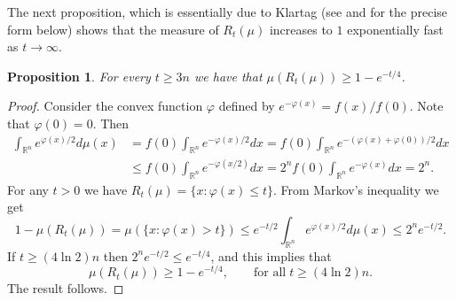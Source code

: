 \documentclass[11pt,leqno]{article}
\newtheorem{proposition}[theorem]{Proposition}
\theoremstyle{definition}
\theoremstyle{remark}
\numberwithin{equation}{section}
\newcommand{\ls}{\leqslant}
\newcommand{\gr}{\geqslant}
\newcommand{\1}{\textbf{1}}
\begin{document}

The next proposition, which is essentially due to Klartag (see \cite[Lemma~5.2]{Klartag-2007} and \cite{Giannopoulos-Tziotziou-2025}
for the precise form below) shows that the measure of $R_t(\mu)$ increases to $1$
exponentially fast as $t\to\infty $.

\begin{proposition}\label{prop:r-2}For every $t\gr 3n$ we have that $\mu(R_t(\mu ))\gr 1-e^{-t/4}$.
\end{proposition}

\begin{proof}Consider the convex function $\varphi$ defined by $e^{-\varphi(x)}=f(x)/f(0)$. Note that $\varphi(0)=0$.
Then
\begin{align*}
\int_{\mathbb{R}^n}e^{\varphi(x)/2}d\mu(x) &=f(0)\int_{\mathbb{R}^n}e^{-\varphi(x)/2}dx=f(0)\int_{\mathbb{R}^n}e^{-(\varphi(x)+\varphi(0))/2}dx\\
&\ls f(0)\int_{\mathbb{R}^n}e^{-\varphi(x/2)}dx=2^nf(0)\int_{\mathbb{R}^n}e^{-\varphi(x)}dx=2^n.
\end{align*}
For any $t>0$ we have $R_t(\mu)=\{x:\varphi(x)\ls t\}$. From Markov's inequality we get
$$1-\mu(R_t(\mu))=\mu(\{x:\varphi(x)>t\})\ls e^{-t/2}\int_{\mathbb{R}^n}e^{\varphi(x)/2}d\mu(x)\ls 2^ne^{-t/2}.$$
If $t\gr (4\ln 2)n$ then $2^ne^{-t/2}\ls e^{-t/4}$, and this implies that
$$\mu(R_t(\mu))\gr 1-e^{-t/4},\qquad\text{for all}\;t\gr (4\ln 2)n.$$
The result follows. \end{proof}
\end{document}
